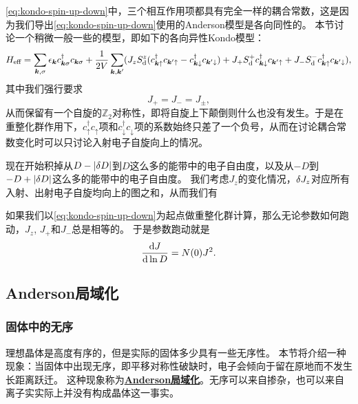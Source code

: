 \documentclass[hyperref, UTF8, a4paper]{ctexart}
\newcommand*{\concept}[1]{\underline{\textbf{#1}}}
\begin{document}
\eqref{eq:kondo-spin-up-down}中，三个相互作用项都具有完全一样的耦合常数，这是因为我们导出\eqref{eq:kondo-spin-up-down}使用的Anderson模型是各向同性的。
本节讨论一个稍微一般一些的模型，即如下的各向异性Kondo模型：
\begin{equation}
    {H}_\text{eff} = \sum_{\vb*{k}, \sigma} \epsilon_{\vb*{k}} {c}^\dagger_{\vb*{k} \sigma} {c}_{\vb*{k} \sigma} + \frac{1}{2V} \sum_{\vb*{k}, \vb*{k}'} (
        J_z {S}_\text{d}^z ({c}^\dagger_{\vb*{k} \uparrow} {c}_{\vb*{k}' \uparrow} - {c}^\dagger_{\vb*{k} \downarrow} {c}_{\vb*{k}' \downarrow})
        + J_+ {S}^+_\text{d} {c}^\dagger_{\vb*{k} \downarrow} {c}_{\vb*{k}' \uparrow}
        + J_- {S}^-_\text{d} {c}^\dagger_{\vb*{k} \uparrow} {c}_{\vb*{k}' \downarrow}
    ),
\end{equation}
其中我们强行要求
\begin{equation}
    J_+ = J_- = J_\pm,
\end{equation}
从而保留有一个自旋的$\mathbb{Z}_2$对称性，即将自旋上下颠倒则什么也没有发生。于是在重整化群作用下，${c}^\dagger_\uparrow {c}_\uparrow$项和${c}^\dagger_\downarrow {c}_\downarrow$项的系数始终只差了一个负号，从而在讨论耦合常数变化时可以只讨论入射电子自旋向上的情况。

现在开始积掉从$D-\abs{\var{D}}$到$D$这么多的能带中的电子自由度，以及从$-D$到$-D+\abs{\var{D}}$这么多的能带中的电子自由度。
我们考虑$J_z$的变化情况，$\var{J_z}$对应所有入射、出射电子自旋均向上的图之和，从而我们有


如果我们以\eqref{eq:kondo-spin-up-down}为起点做重整化群计算，那么无论参数如何跑动，$J_z$, $J_+$和$J_-$总是相等的。
于是参数跑动就是
\begin{equation}
    \dv{J}{\ln D} = N(0) J^2.
\end{equation}

\subsection{Anderson局域化}

\subsubsection{固体中的无序}

理想晶体是高度有序的，但是实际的固体多少具有一些无序性。
本节将介绍一种现象：当固体中出现无序，即平移对称性破缺时，电子会倾向于留在原地而不发生长距离跃迁。
这种现象称为\concept{Anderson局域化}。无序可以来自掺杂，也可以来自离子实实际上并没有构成晶体这一事实。
\end{document}
